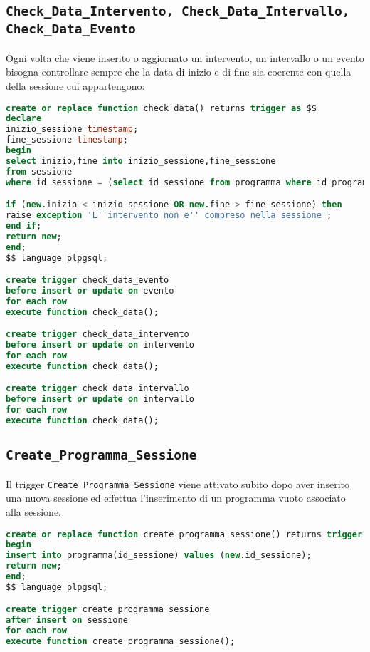 \subsection{\texttt{Check\_Data\_Intervento, Check\_Data\_Intervallo, Check\_Data\_Evento}}\label{trigger:check_data}
Ogni volta che viene inserito o aggiornato un intervento, un intervallo o un evento bisogna controllare sempre che la data di inizio e di fine sia coerente con quella della sessione cui appartengono:
\begin{lstlisting}[caption={check\_data\_intervento},language=SQL,style=mystyle]
create or replace function check_data() returns trigger as $$
declare
inizio_sessione timestamp;
fine_sessione timestamp;
begin
select inizio,fine into inizio_sessione,fine_sessione
from sessione
where id_sessione = (select id_sessione from programma where id_programma = new.id_programma);

if (new.inizio < inizio_sessione OR new.fine > fine_sessione) then
raise exception 'L''intervento non e'' compreso nella sessione';
end if;
return new;
end;
$$ language plpgsql;

create trigger check_data_evento
before insert or update on evento
for each row
execute function check_data();

create trigger check_data_intervento
before insert or update on intervento
for each row
execute function check_data();

create trigger check_data_intervallo
before insert or update on intervallo
for each row
execute function check_data();
\end{lstlisting}
\subsection{\texttt{Create\_Programma\_Sessione}}
Il trigger \texttt{Create\_Programma\_Sessione} viene attivato subito dopo aver inserito una nuova sessione ed effettua l'inserimento di un programma vuoto associato alla sessione.
\begin{lstlisting}[language=SQL, caption={\texttt{create\_programma\_sessione}},style=mystyle]
create or replace function create_programma_sessione() returns trigger as $$
begin
insert into programma(id_sessione) values (new.id_sessione);
return new;
end;
$$ language plpgsql;

create trigger create_programma_sessione
after insert on sessione
for each row
execute function create_programma_sessione();
\end{lstlisting}
